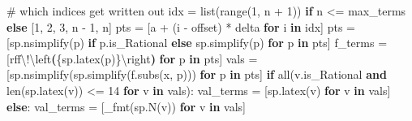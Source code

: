 \documentclass[
  letterpaper,
  DIV=11,
  numbers=noendperiod]{scrreprt}
\newenvironment{Shaded}{\begin{snugshade}}{\end{snugshade}}
\newcommand{\BuiltInTok}[1]{\textcolor[rgb]{0.00,0.23,0.31}{#1}}
\newcommand{\CharTok}[1]{\textcolor[rgb]{0.13,0.47,0.30}{#1}}
\newcommand{\CommentTok}[1]{\textcolor[rgb]{0.37,0.37,0.37}{#1}}
\newcommand{\ControlFlowTok}[1]{\textcolor[rgb]{0.00,0.23,0.31}{\textbf{#1}}}
\newcommand{\DecValTok}[1]{\textcolor[rgb]{0.68,0.00,0.00}{#1}}
\newcommand{\ErrorTok}[1]{\textcolor[rgb]{0.68,0.00,0.00}{#1}}
\newcommand{\KeywordTok}[1]{\textcolor[rgb]{0.00,0.23,0.31}{\textbf{#1}}}
\newcommand{\NormalTok}[1]{\textcolor[rgb]{0.00,0.23,0.31}{#1}}
\newcommand{\OperatorTok}[1]{\textcolor[rgb]{0.37,0.37,0.37}{#1}}
\newcommand{\SpecialCharTok}[1]{\textcolor[rgb]{0.37,0.37,0.37}{#1}}
\newcommand{\VerbatimStringTok}[1]{\textcolor[rgb]{0.13,0.47,0.30}{#1}}
\theoremstyle{plain}
\theoremstyle{plain}
\theoremstyle{definition}
\theoremstyle{definition}
\theoremstyle{definition}
\theoremstyle{plain}
\theoremstyle{plain}
\theoremstyle{remark}
\begin{document}
\begin{Shaded}
\begin{Highlighting}[]
    \CommentTok{\# which indices get written out}
\NormalTok{    idx }\OperatorTok{=} \BuiltInTok{list}\NormalTok{(}\BuiltInTok{range}\NormalTok{(}\DecValTok{1}\NormalTok{, n }\OperatorTok{+} \DecValTok{1}\NormalTok{)) }\ControlFlowTok{if}\NormalTok{ n }\OperatorTok{\textless{}=}\NormalTok{ max\_terms }\ControlFlowTok{else}\NormalTok{ [}\DecValTok{1}\NormalTok{, }\DecValTok{2}\NormalTok{, }\DecValTok{3}\NormalTok{, n }\OperatorTok{{-}} \DecValTok{1}\NormalTok{, n]}
\NormalTok{    pts }\OperatorTok{=}\NormalTok{ [a }\OperatorTok{+}\NormalTok{ (i }\OperatorTok{{-}}\NormalTok{ offset) }\OperatorTok{*}\NormalTok{ delta }\ControlFlowTok{for}\NormalTok{ i }\KeywordTok{in}\NormalTok{ idx]}
\NormalTok{    pts }\OperatorTok{=}\NormalTok{ [sp.nsimplify(p) }\ControlFlowTok{if}\NormalTok{ p.is\_Rational }\ControlFlowTok{else}\NormalTok{ sp.simplify(p) }\ControlFlowTok{for}\NormalTok{ p }\KeywordTok{in}\NormalTok{ pts]}
\NormalTok{    f\_terms }\OperatorTok{=}\NormalTok{ [}\VerbatimStringTok{rf\textquotesingle{}f}\CharTok{\textbackslash{}!}\ErrorTok{\textbackslash{}}\VerbatimStringTok{left}\KeywordTok{(}\SpecialCharTok{\{}\NormalTok{sp}\SpecialCharTok{.}\NormalTok{latex(p)}\SpecialCharTok{\}}\CharTok{\textbackslash{}r}\VerbatimStringTok{ight}\KeywordTok{)}\VerbatimStringTok{\textquotesingle{}} \ControlFlowTok{for}\NormalTok{ p }\KeywordTok{in}\NormalTok{ pts]}
\NormalTok{    vals }\OperatorTok{=}\NormalTok{ [sp.nsimplify(sp.simplify(f.subs(x, p))) }\ControlFlowTok{for}\NormalTok{ p }\KeywordTok{in}\NormalTok{ pts]}
    \ControlFlowTok{if} \BuiltInTok{all}\NormalTok{(v.is\_Rational }\KeywordTok{and} \BuiltInTok{len}\NormalTok{(sp.latex(v)) }\OperatorTok{\textless{}=} \DecValTok{14} \ControlFlowTok{for}\NormalTok{ v }\KeywordTok{in}\NormalTok{ vals):}
\NormalTok{        val\_terms }\OperatorTok{=}\NormalTok{ [sp.latex(v) }\ControlFlowTok{for}\NormalTok{ v }\KeywordTok{in}\NormalTok{ vals]}
    \ControlFlowTok{else}\NormalTok{:}
\NormalTok{        val\_terms }\OperatorTok{=}\NormalTok{ [\_fmt(sp.N(v)) }\ControlFlowTok{for}\NormalTok{ v }\KeywordTok{in}\NormalTok{ vals]}


\end{Highlighting}
\end{Shaded}
\end{document}
